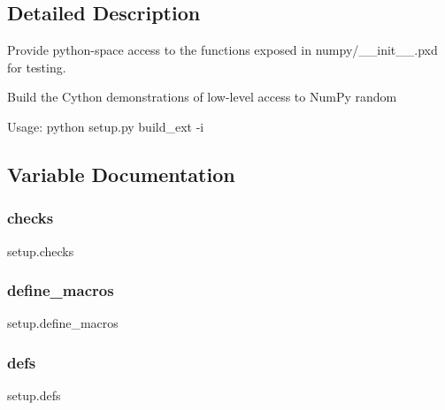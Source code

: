 \subsection{Detailed Description}
\begin{DoxyVerb}Provide python-space access to the functions exposed in numpy/__init__.pxd
for testing.
\end{DoxyVerb}


\begin{DoxyVerb}Build the Cython demonstrations of low-level access to NumPy random

Usage: python setup.py build_ext -i
\end{DoxyVerb}
 

\subsection{Variable Documentation}
\mbox{\label{namespacesetup_acc4a649fba9fedfaf1f9c200e197e96b}} 
\subsubsection{\texorpdfstring{checks}{checks}}
{\footnotesize\ttfamily setup.\+checks}

\mbox{\label{namespacesetup_af8c11b3218cdfa084ea78be7e73974bf}} 
\subsubsection{\texorpdfstring{define\+\_\+macros}{define\_macros}}
{\footnotesize\ttfamily setup.\+define\+\_\+macros}

\mbox{\label{namespacesetup_af90b2ad2378213038ae38ac1150a2376}} 
\subsubsection{\texorpdfstring{defs}{defs}}
{\footnotesize\ttfamily setup.\+defs}

\mbox{\label{namespacesetup_a6c5e2e54ed09e9c891f2e1d3fb227eda}} 
